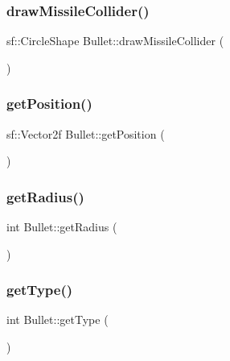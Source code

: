 \mbox{\label{class_bullet_ac8c9c18e09ff7ef97313aa0c805c9846}} 
\subsubsection{\texorpdfstring{draw\+Missile\+Collider()}{drawMissileCollider()}}
{\footnotesize\ttfamily sf\+::\+Circle\+Shape Bullet\+::draw\+Missile\+Collider (\begin{DoxyParamCaption}{ }\end{DoxyParamCaption})}

\mbox{\label{class_bullet_a64e4ce634f62ab31d338bd142c1987c9}} 
\subsubsection{\texorpdfstring{get\+Position()}{getPosition()}}
{\footnotesize\ttfamily sf\+::\+Vector2f Bullet\+::get\+Position (\begin{DoxyParamCaption}{ }\end{DoxyParamCaption})}

\mbox{\label{class_bullet_a781ca8ccaf366435ece65eacd79e8b44}} 
\subsubsection{\texorpdfstring{get\+Radius()}{getRadius()}}
{\footnotesize\ttfamily int Bullet\+::get\+Radius (\begin{DoxyParamCaption}{ }\end{DoxyParamCaption})}

\mbox{\label{class_bullet_a73634149134359bca3f2201fb6284707}} 
\subsubsection{\texorpdfstring{get\+Type()}{getType()}}
{\footnotesize\ttfamily int Bullet\+::get\+Type (\begin{DoxyParamCaption}{ }\end{DoxyParamCaption})}

